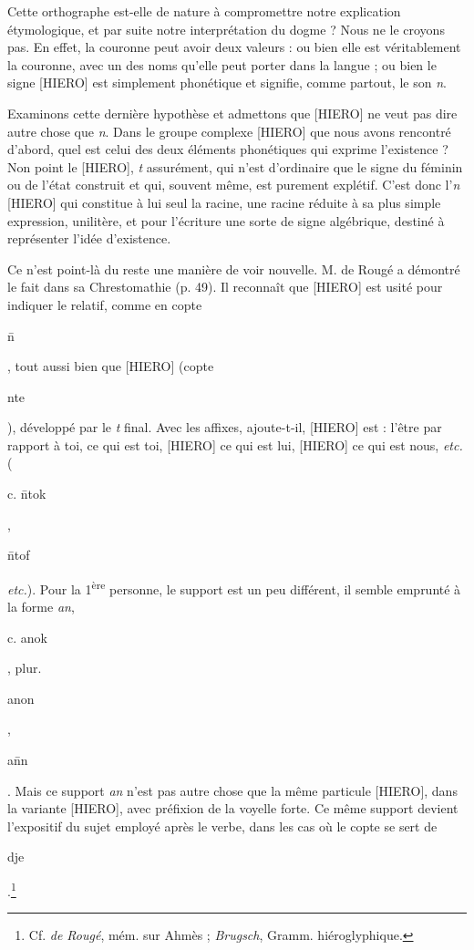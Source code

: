 \documentclass[a4paper, 11pt, oneside]{article}
\begin{document}
Cette orthographe est-elle de nature à compromettre notre explication étymologique, et par suite notre interprétation du dogme ? Nous ne le croyons pas. En effet, la couronne peut avoir deux valeurs : ou bien elle est véritablement la couronne, avec un des noms qu'elle peut porter dans la langue ; ou bien le signe [HIERO] est simplement phonétique et signifie, comme partout, le son \emph{n}.

Examinons cette dernière hypothèse et admettons que [HIERO] ne veut pas dire autre chose que \emph{n}. Dans le groupe complexe [HIERO] que nous avons rencontré d'abord, quel est celui des deux éléments phonétiques qui exprime l'existence ? Non point le [HIERO], \emph{t} assurément, qui n'est d'ordinaire que le signe du féminin ou de l'état construit et qui, souvent même, est purement explétif. C'est donc l'\emph{n} [HIERO] qui constitue à lui seul la racine, une racine réduite à sa plus simple expression, unilitère, et pour l'écriture une sorte de signe algébrique, destiné à représenter l'idée d'existence.

Ce n'est point-là du reste une manière de voir nouvelle. M. de Rougé a démontré le fait dans sa Chrestomathie (p. 49). Il reconnaît que [HIERO] est usité pour indiquer le relatif, comme en copte \begin{coptic}\=n\end{coptic}, tout aussi bien que [HIERO] (copte \begin{coptic}nte\end{coptic}), développé par le \emph{t} final. Avec les affixes, ajoute-t-il, [HIERO] est : l'être par rapport à toi, ce qui est toi, [HIERO] ce qui est lui, [HIERO] ce qui est nous, \emph{etc.} (\begin{coptic}c. \=ntok\end{coptic}, \begin{coptic}\=ntof\end{coptic} \emph{etc.}). Pour la 1\textsuperscript{ère} personne, le support est un peu différent, il semble emprunté à la forme \emph{an}, \begin{coptic}c. anok\end{coptic}, plur. \begin{coptic}anon\end{coptic}, \begin{coptic}a\=nn\end{coptic}. Mais ce support \emph{an} n'est pas autre chose que la même particule [HIERO], dans la variante [HIERO], avec préfixion de la voyelle forte. Ce même support devient l'expositif du sujet employé après le verbe, dans les cas où le copte se sert de \begin{coptic}dje\end{coptic}.\footnote{Cf. \emph{de Rougé}, mém. sur Ahmès ; \emph{Brugsch}, Gramm. hiéroglyphique.}
\end{document}
